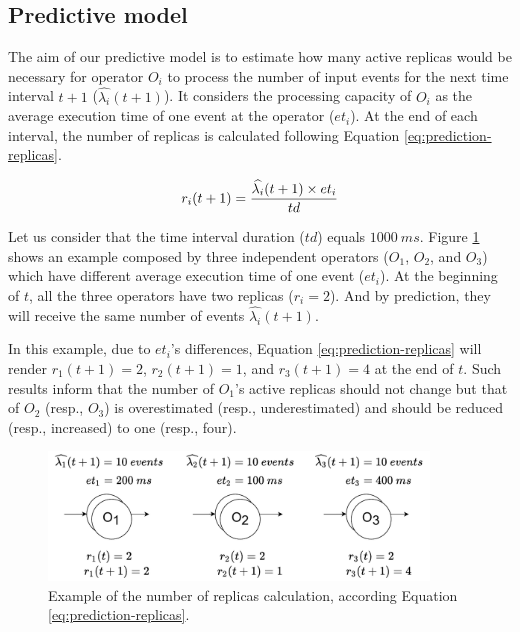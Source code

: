 \subsection{Predictive model}
The aim of our predictive model is to estimate how many active replicas would be necessary for operator $O_i$ to process the number of input events for the next time interval $t+1$ ($\widehat{\lambda_i}(t+1)$). It considers the processing capacity of $O_i$ as the average execution time of one event at the operator ($et_i$). At the end of each interval, the number of replicas is calculated following Equation \ref{eq:prediction-replicas}.

\begin{equation}
    \label{eq:prediction-replicas}
    r_i(t+1) = \frac{\widehat{\lambda_i}(t+1) \times et_i}{td}\\
\end{equation}

Let us consider that the time interval duration ($td$) equals $1000~ms$. Figure \ref{fig:prediction-replicas} shows an example composed by three independent operators  ($O_1$, $O_2$, and $O_3$) which have different average execution time of one event ($et_i$).  At the beginning of $t$, all the three operators have two replicas ($r_i = 2$). And by prediction, they will receive the same number of events $\widehat{\lambda_i}(t+1)$. 

In this example, due to $et_i$'s differences, Equation \ref{eq:prediction-replicas} will render $r_1(t+1)=2$, $r_2(t+1)=1$, and $r_3(t+1)=4$ at the end of $t$. Such results inform that the number of $O_1$'s active replicas should not change but that of $O_2$ (resp., $O_3$) is overestimated (resp., underestimated) and should be reduced (resp., increased) to one (resp., four). 

\begin{figure}[!ht]
    \centering
    \includegraphics[width=0.9\textwidth]{figures/concepts/PA-SPS-PredictiveModel.pdf}
    \caption{Example of the number of replicas calculation, according Equation \ref{eq:prediction-replicas}.}
    \label{fig:prediction-replicas}
\end{figure}

